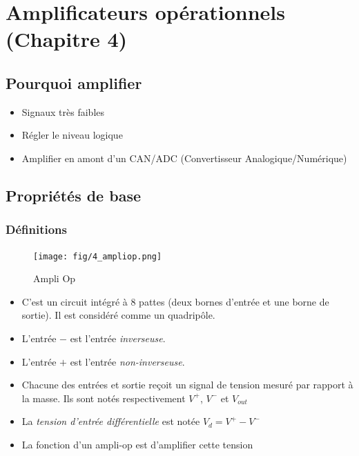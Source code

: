 \documentclass[a4paper]{article}
\begin{document}
\section{Amplificateurs opérationnels (Chapitre 4)}
    \subsection{Pourquoi amplifier}
        \begin{itemize}
            \item Signaux très faibles
            \item Régler le niveau logique
            \item Amplifier en amont d'un CAN/ADC (Convertisseur Analogique/Numérique)
        \end{itemize}

    \subsection{Propriétés de base}
        \subsubsection{Définitions}
            \begin{figure}[H]
                \begin{center}
                    \texttt{[image: fig/4\_ampliop.png]}
                    \caption{Ampli Op}
                \end{center}
            \end{figure}
            \begin{itemize} 
            \item C'est un circuit intégré à 8 pattes (deux bornes d'entrée et une borne de sortie). Il est considéré comme un quadripôle.
            \item L'entrée $-$ est l'entrée \textit{inverseuse}.
            \item L'entrée $+$ est l'entrée \textit{non-inverseuse}.
            \item Chacune des entrées et sortie reçoit un signal de tension mesuré par rapport à la masse. Ils sont notés respectivement $ V^{+} $, $ V^{-} $ et $ V_{out} $
            \item La \textit{tension d'entrée différentielle} est notée $ V_{d} = V^{+} - V^{-} $
            \item La fonction d'un ampli-op est d'amplifier cette tension
            \end{itemize}
\end{document}
